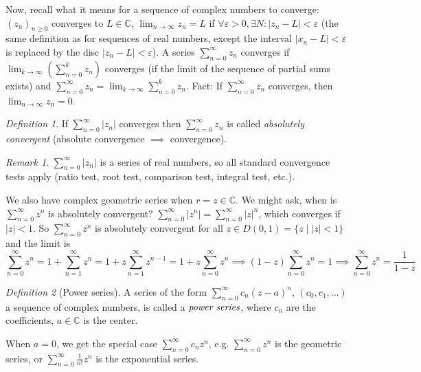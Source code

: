 \documentclass{article}
\theoremstyle{plain}
\theoremstyle{remark}
\newtheorem{definition}{Definition}
\newtheorem{remark}{Remark}
\newcommand{\C}{{\mathbb C}}
\newcommand{\ep}{{\varepsilon}}
\begin{document}
Now, recall what it means for a sequence of complex numbers to converge:
$(z_n)_{n \geq 0}$ converges to $L \in \C$, $\lim_{n\to\infty} z_n = L$
if $\forall \ep > 0, \exists N \colon |z_n - L| < \ep$
(the same definition as for sequences of real numbers,
except the interval $|x_n - L| < \ep$ is replaced by the disc $|z_n - L| < \ep$).
A series $\sum_{n = 0}^\infty z_n$ converges if
$\lim_{k \to \infty}\left(\sum_{n=0}^k z_n \right)$ converges
(if the limit of the sequence of partial sums exists)
and $\sum_{n = 0}^\infty z_n = \lim_{k \to \infty} \sum_{n = 0}^k z_n$.
Fact: If $\sum_{n=0}^\infty z_n$ converges, then $\lim_{n \to \infty} z_n = 0$.
\begin{definition}
	If $\sum_{n=0}^\infty |z_n|$ converges then $\sum_{n=0}^\infty z_n$
	is called \emph{absolutely convergent} (absolute convergence $\implies$ convergence).
\end{definition}
\begin{remark}
	$\sum_{n=0}^\infty|z_n|$ is a series of real numbers,
	so all standard convergence tests apply
	(ratio test, root test, comparison test, integral test, etc.).
\end{remark}

We also have complex geometric series when $r = z \in \C$.
We might ask, when is $\sum_{n = 0}^\infty z^n$ is absolutely convergent?
$\sum_{n=0}^\infty |z^n| = \sum_{n=0}^\infty |z|^n$,
which converges if $|z| < 1$.
So $\sum_{n=0}^\infty z^n$ is absolutely convergent for all
$z \in D(0,1) = \{z \mid |z| < 1\}$ and the limit is
\[
	\sum_{n=0}^\infty z^n = 1 + \sum_{n=1}^\infty z^n = 1+z\sum_{n=1}^\infty z^{n-1}
	= 1 + z\sum_{n=0}^\infty z^n
	\implies (1-z)\sum_{n=0}^\infty z^n = 1 \implies
	\sum_{n=0}^\infty z^n = \frac{1}{1-z}
\]

\begin{definition}[Power series]
	A series of the form $\sum_{n=0}^\infty c_n(z-a)^n$,
	$(c_0,c_1,\dots)$ a sequence of complex numbers,
	is called a $\emph{power series}$,
	where $c_n$ are the coefficients, $a\in \C$ is the center.
\end{definition}
When $a = 0$, we get the special case $\sum_{n=0}^\infty c_nz^n$,
e.g. $\sum_{n=0}^\infty z^n$ is the geometric series,
or $\sum_{n=0}^\infty \frac{1}{n!}z^n$ is the exponential series.
\end{document}
